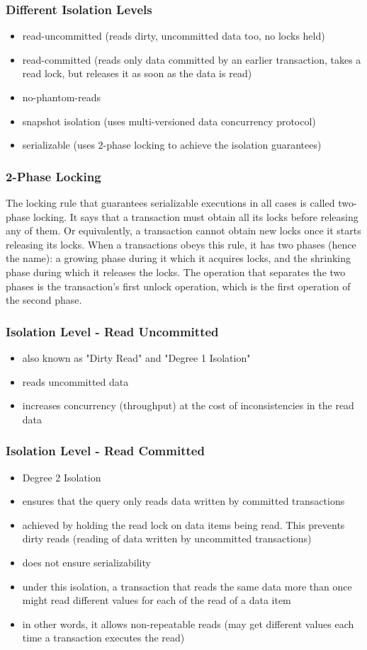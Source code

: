 \documentclass[12]{beamer}
\begin{document}
\begin{frame}
\frametitle{Different Isolation Levels}
\begin{itemize}
\item read-uncommitted (reads dirty, uncommitted data too, no locks held)
\item read-committed (reads only data committed by an earlier transaction, takes a read lock, but releases it as soon as the data is read)
\item no-phantom-reads
\item snapshot isolation (uses multi-versioned data concurrency protocol)
\item serializable (uses 2-phase locking to achieve the isolation guarantees)
\end{itemize}
\end{frame}

\begin{frame}
\frametitle{2-Phase Locking}
The locking rule that guarantees serializable executions in all cases is called two-phase locking. It says that a transaction must obtain all its locks before releasing any of them. Or equivalently, a transaction cannot obtain new locks once it starts releasing its locks. When a transactions obeys this rule, it has two phases (hence the name): a growing phase during it which it acquires locks, and the shrinking phase during which it releases the locks. The operation that separates the two phases is the transaction's first unlock operation, which is the first operation of the second phase.
\end{frame}

\begin{frame}
\frametitle{Isolation Level - Read Uncommitted}
\begin{itemize}
\item also known as "Dirty Read" and "Degree 1 Isolation"
\item reads uncommitted data
\item increases concurrency (throughput) at the cost of inconsistencies in the read data
\end{itemize}
\end{frame}

\begin{frame}
\frametitle{Isolation Level - Read Committed}
\begin{itemize}
\item Degree 2 Isolation
\item ensures that the query only reads data written by committed transactions
\item achieved by holding the read lock on data items being read. This prevents dirty reads (reading of data written by uncommitted transactions)
\item does not ensure serializability
\item under this isolation, a transaction that reads the same data more than once might read different values for each of the read of a data item
\item in other words, it allows non-repeatable reads (may get different values each time a transaction executes the read)
\end{itemize}
\end{frame}
\end{document}
